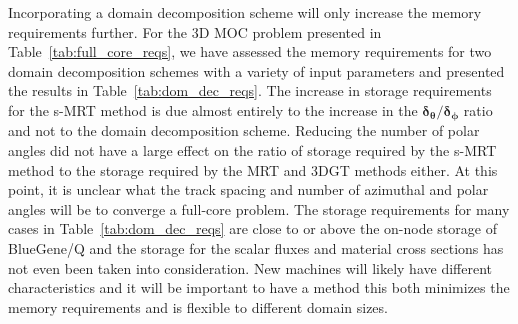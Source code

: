 Incorporating a domain decomposition scheme will only increase the memory requirements further. For the 3D MOC problem presented in Table~\ref{tab:full_core_reqs}, we have assessed the memory requirements for two domain decomposition schemes with a variety of input parameters and presented the results in Table~\ref{tab:dom_dec_reqs}. The increase in storage requirements for the s-MRT method is due almost entirely to the increase in the $\boldsymbol{\delta_{\theta}}/\boldsymbol{\delta_{\phi}}$ ratio and not to the domain decomposition scheme. Reducing the number of polar angles did not have a large effect on the ratio of storage required by the s-MRT method to the storage required by the MRT and 3DGT methods either. At this point, it is unclear what the track spacing and number of azimuthal and polar angles will be to converge a full-core problem. The storage requirements for many cases in Table~\ref{tab:dom_dec_reqs} are close to or above the on-node storage of BlueGene/Q and the storage for the scalar fluxes and material cross sections has not even been taken into consideration. New machines will likely have different characteristics and it will be important to have a method this both minimizes the memory requirements and is flexible to different domain sizes.  

